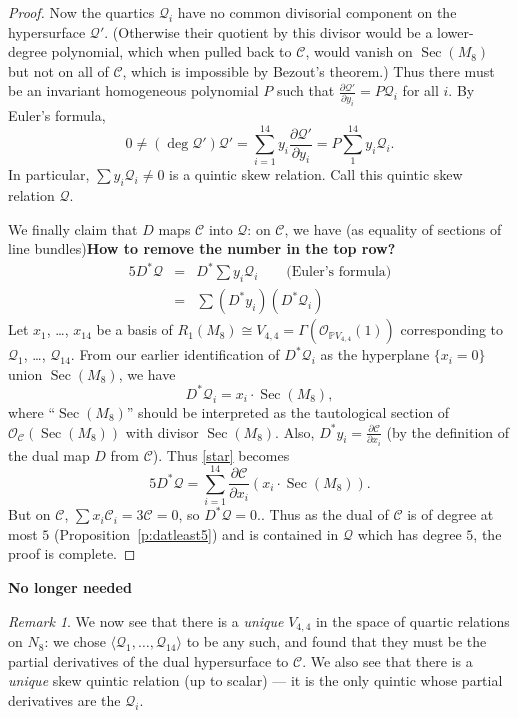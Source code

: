 \documentclass{amsart}
\theoremstyle{definition}
\theoremstyle{remark}
\newtheorem{remark}[theorem]{\it Remark}
\DeclareMathOperator{\Sec}{Sec}
\def\proj{\mathbb{P}}
\def\cubic{\mathcal{C}}
\def\oh{\mathcal{O}}
\def\quintic{\mathcal{Q}}
\begin{document}
{\begin{proof}
Now  the quartics $\quintic_i$ have no common divisorial component on
the  hypersurface $\quintic'$. (Otherwise
their quotient by this divisor would be a
lower-degree polynomial, which when pulled back to $\cubic$, would vanish
on $\Sec(M_8)$ but not on all of $\cubic$, which is impossible by Bezout's
theorem.)  Thus  there must be an invariant homogeneous
polynomial $P$ such
that $\frac{ \partial \quintic'} {\partial y_i} = P \quintic_i$ for all $i$.  By Euler's
formula, $$0 \neq (\deg \quintic') \quintic' = \sum_{i=1}^{14} y_i
\frac{ \partial \quintic'} {\partial y_i} = P \sum_1^{14} y_i  \quintic_i.$$  In particular, $\sum y_i \quintic_i \neq 0$ is a
quintic skew relation.  Call this quintic skew relation $\quintic$.

We finally claim that $D$ maps $\cubic$ into $\quintic$:
on $\cubic$, we have  (as equality of sections of line bundles){\bf How
to remove the number in the top row?}
\begin{eqnarray}
5 D^* \quintic & = & D^* \sum y_i \quintic_i \quad \quad \text{(Euler's
  formula)}\\
&=& \sum (D^* y_i) (D^* \quintic_i) \label{star}
\end{eqnarray}
Let $x_1$, \dots, $x_{14}$ be a basis of $R_1(M_8) \cong V_{4,4} =
\Gamma( \oh_{\proj V_{4,4}}(1))$ corresponding to
$\quintic_1$, \dots, $\quintic_{14}$.
From our earlier identification of $D^* \quintic_i$ as the hyperplane
$\{ x_i=0 \}$ union  $\Sec  (M_8)$,
we have 
\begin{equation}\label{eq:denver}
D^* \quintic_i = x_i \cdot \Sec (M_8),
\end{equation}
where ``$\Sec (M_8)$'' should be interpreted as the tautological
section of $\mathcal{O}_{\cubic}( \Sec (M_8))$ with divisor $\Sec (M_8)$.  Also, $D^* y_i = \frac {\partial
  \cubic} {\partial x_i}$ (by the definition of the dual map $D$ from $\cubic$).
Thus \eqref{star} becomes
$$
5 D^* \quintic  = \sum_{i=1}^{14} \frac {\partial \cubic} {\partial x_i}  ( x_i  \cdot \Sec (M_8)).
$$
But on $\cubic$,
$\sum x_i \cubic_i  = 3 \cubic = 0$, so $D^* \quintic = 0$..
Thus as the dual of $\cubic$ is
of degree at most $5$ (Proposition~\ref{p:datleast5}) and is  contained in $\quintic$ which has degree $5$, the proof is
complete.\end{proof}

{\bf No longer needed}
\begin{remark}
We now see that there is a
{\em unique} $V_{4,4}$ in the space of quartic relations on $N_8$:  we
chose $\langle \quintic_1, \dots, \quintic_{14} \rangle$ to be any such, and
found that they must be the partial derivatives of the dual
hypersurface to $\cubic$.
We also see that there is a {\em unique} skew quintic relation (up to
scalar) --- it is the only quintic  whose partial derivatives are the $\quintic_i$.
\end{remark}
}%
\end{document}
